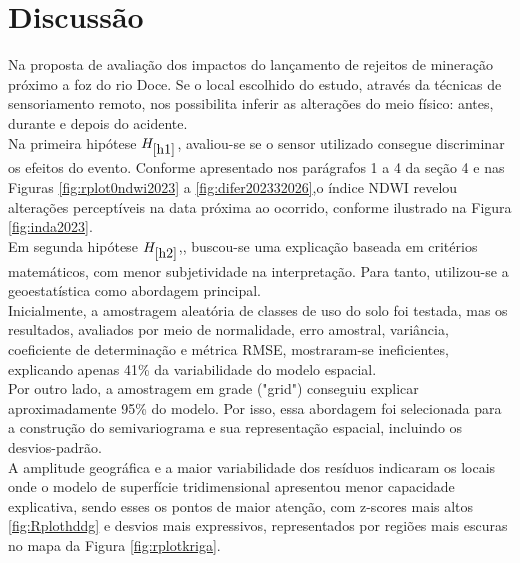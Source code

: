  
\section{Discussão }

 \hspace*{1.25 cm} Na proposta de avaliação dos impactos do lançamento de rejeitos de mineração próximo a foz do rio Doce. Se o local escolhido do estudo, através da técnicas de sensoriamento remoto, nos possibilita inferir as alterações do meio físico: antes, durante e depois do acidente.\\
 \hspace*{1.25 cm} Na primeira hipótese \textbf{\textcolor{blue}{$ H_{\ref{h1}}$}}, avaliou-se se o sensor utilizado consegue discriminar os efeitos do evento. Conforme apresentado nos parágrafos 1 a 4 da seção 4 e nas Figuras \ref{fig:rplot0ndwi2023} a \ref{fig:difer202332026},o índice NDWI revelou alterações perceptíveis na data próxima ao ocorrido, conforme ilustrado na Figura \ref{fig:inda2023}. \\
 \hspace*{1.25 cm} Em segunda hipótese \textbf{\textcolor{blue}{$ H_{\ref{h2}}$}},, buscou-se uma explicação baseada em critérios matemáticos, com menor subjetividade na interpretação. Para tanto, utilizou-se a geoestatística como abordagem principal. \\
 \hspace*{1.25 cm} Inicialmente, a amostragem aleatória de classes de uso do solo foi testada, mas os resultados, avaliados por meio de normalidade, erro amostral, variância, coeficiente de determinação e métrica RMSE, mostraram-se ineficientes, explicando apenas 41\% da variabilidade do modelo espacial.\\
 \hspace*{1.25 cm} Por outro lado, a amostragem em grade ("grid") conseguiu explicar aproximadamente 95\% do modelo. Por isso, essa abordagem foi selecionada para a construção do semivariograma e sua representação espacial, incluindo os desvios-padrão.\\
 \hspace*{1.25 cm} A amplitude geográfica e a maior variabilidade dos resíduos indicaram os locais onde o modelo de superfície tridimensional apresentou menor capacidade explicativa, sendo esses os pontos de maior atenção, com z-scores mais altos \ref{fig:Rplothddg} e desvios mais expressivos, representados por regiões mais escuras no mapa da Figura \ref{fig:rplotkriga}.\\
